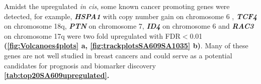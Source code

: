 Amidst the upregulated \textit{in cis}, some known cancer promoting genes were detected, for example, \textit{\textbf{HSPA1}} \cite{zoppino2018comprehensive} with copy number gain on chromosome 6 , \textit{\textbf{TCF4}} \cite{ravindranath2011wnt} on chromosome 18q, %
\textit{\textbf{PTN}} \cite{huang2018chemotherapy} on chromosome 7,        
\textit{\textbf{ID4}} \cite{donzelli2018expression} on chromosome 6 and  
\textit{\textbf{RAC3}} \cite{donnelly2017rac3} on chromosome 17q were two fold upregulated with FDR$<$0.01 \textbf{(\autoref{fig:Volcanoes4plots} a, \autoref{fig:trackplotsSA609SA1035} b)}. Many of these genes are not well studied in breast cancers and could serve as a potential candidates for prognosis and biomarker discovery \textbf{\autoref{tab:top20SA609upregulated}.}

